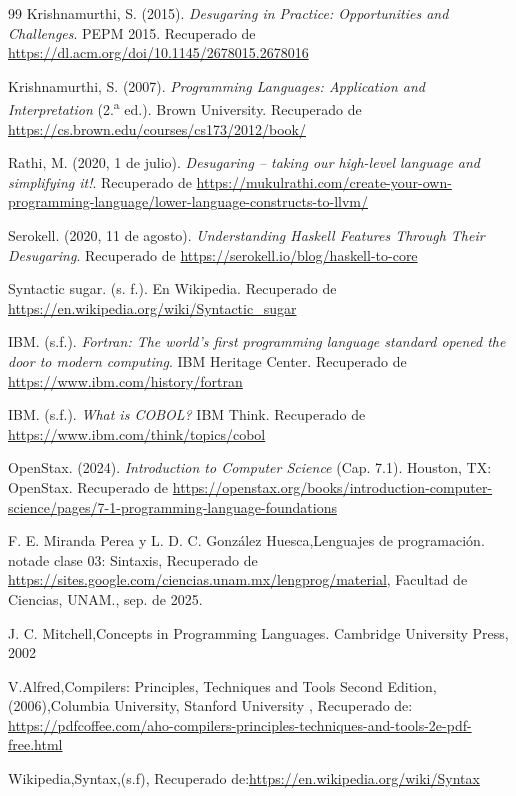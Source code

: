 \documentclass[a4paper,12pt]{article}
\begin{document}
\begin{thebibliography}{99}
Krishnamurthi, S. (2015). \textit{Desugaring in Practice: Opportunities and Challenges}. PEPM 2015. Recuperado de \url{https://dl.acm.org/doi/10.1145/2678015.2678016}

Krishnamurthi, S. (2007). \textit{Programming Languages: Application and Interpretation} (2.\textsuperscript{a} ed.). Brown University. Recuperado de 
\url{https://cs.brown.edu/courses/cs173/2012/book/}

Rathi, M. (2020, 1 de julio). \textit{Desugaring – taking our high-level language and simplifying it!}. Recuperado de 
\url{https://mukulrathi.com/create-your-own-programming-language/lower-language-constructs-to-llvm/}

Serokell. (2020, 11 de agosto). \textit{Understanding Haskell Features Through Their Desugaring}. Recuperado de
\url{https://serokell.io/blog/haskell-to-core}

Syntactic sugar. (s. f.). En Wikipedia. Recuperado de 
\url{https://en.wikipedia.org/wiki/Syntactic_sugar}

IBM. (s.f.). \textit{Fortran: The world’s first programming language standard opened the door to modern computing}. IBM Heritage Center. Recuperado de \url{https://www.ibm.com/history/fortran}

IBM. (s.f.). \textit{What is COBOL?} IBM Think. Recuperado de \url{https://www.ibm.com/think/topics/cobol}

OpenStax. (2024). \textit{Introduction to Computer Science} (Cap. 7.1). Houston, TX: OpenStax. Recuperado de \url{https://openstax.org/books/introduction-computer-science/pages/7-1-programming-language-foundations}

F. E. Miranda Perea y L. D. C. González Huesca,Lenguajes de programación. notade clase 03: Sintaxis, Recuperado de \url{https://sites.google.com/ciencias.unam.mx/lengprog/material}, Facultad de Ciencias, UNAM., sep. de 2025.

J. C. Mitchell,Concepts in Programming Languages. Cambridge University Press, 2002

V.Alfred,Compilers: Principles, Techniques and Tools Second Edition,(2006),Columbia University, Stanford University , Recuperado de:
\url{https://pdfcoffee.com/aho-compilers-principles-techniques-and-tools-2e-pdf-free.html}

Wikipedia,Syntax,(s.f), Recuperado de:\url{https://en.wikipedia.org/wiki/Syntax}


\end{thebibliography}
\end{document}

